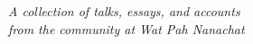 
\cleartorecto
\thispagestyle{empty}
\vspace*{5em}

{\centering

{\Large\chapterTitleFont\scshape\thetitle}
\medskip

{\itshape
A collection of talks, essays, and accounts\\
from the community at Wat Pah Nanachat}
\bigskip

}

